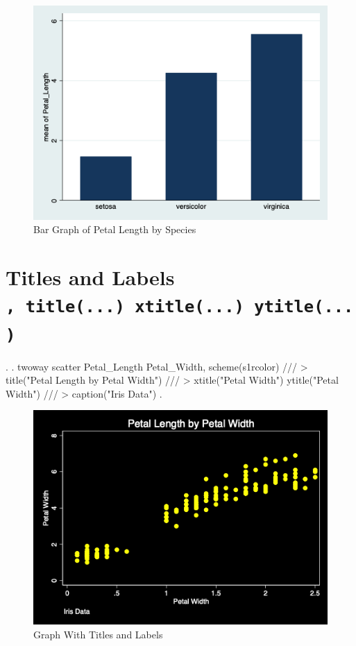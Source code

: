 \documentclass[]{article}
\begin{document}
\begin{stlog}


{\smallskip}

\end{stlog}

\begin{figure}
\centering
\includegraphics[width=0.75\linewidth]{mybargraph3.png}
\caption{Bar Graph of Petal Length by Species}
\end{figure}

\hypertarget{titles-and-labels-title...-xtitle...-ytitle...}{%
\section{\texorpdfstring{Titles and Labels
\texttt{,\ title(...)\ xtitle(...)\ ytitle(...)}}{Titles and Labels , title(...) xtitle(...) ytitle(...)}}\label{titles-and-labels-title...-xtitle...-ytitle...}}

\begin{stlog}
. 
. twoway scatter Petal_Length Petal_Width, scheme(s1rcolor) ///
> title("Petal Length by Petal Width") ///
> xtitle("Petal Width") ytitle("Petal Width") ///
> caption("Iris Data") 
{\smallskip}
. 
\end{stlog}

\begin{stlog}


{\smallskip}

\end{stlog}

\begin{figure}
\centering
\includegraphics[width=0.75\linewidth]{graphtitleslabels.png}
\caption{Graph With Titles and Labels}
\end{figure}
\end{document}

